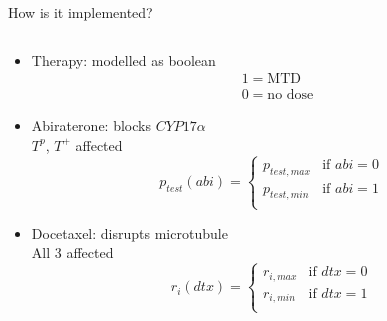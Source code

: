 \begin{frame}{How is it implemented?}
  \begin{columns}
    \begin{column}{0.43\textwidth}
      \begin{itemize}
        \item<1-> Therapy: modelled as boolean
        \begin{equation}
          \begin{aligned}
            & 1 = \text{MTD}\\
            & 0 = \text{no dose}
          \end{aligned}
        \end{equation}
        \item<2-> Abiraterone:
        blocks $CYP17\alpha$ \\ $T^p$, $T^+$ affected
        \begin{equation}
          p_{test}(abi) = \begin{cases}
          p_{test,max} &\text{if } abi = 0 \\
          p_{test,min} &\text{if } abi = 1 \\
          \end{cases}
          \label{p_test_dose_eq}
        \end{equation}

        \item<3-> Docetaxel: disrupts microtubule \\ All 3 affected
        \begin{equation}
          r_i(dtx) = \begin{cases}
          r_{i,max} &\text{if } dtx = 0 \\
          r_{i,min} &\text{if } dtx = 1 \\
          \end{cases}
          \label{r_dose_eq}
        \end{equation}


\end{itemize}
\end{column}
\end{columns}
\end{frame}
